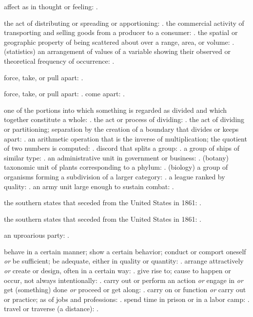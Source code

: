   affect as in thought or feeling: .

  the act of distributing or spreading or apportioning: . the commercial activity of transporting and selling goods from a producer to a consumer: . the spatial or geographic property of being scattered about over a range, area, or volume: . (statistics) an arrangement of values of a variable showing their observed or theoretical frequency of occurrence: .

  force, take, or pull apart: .

  force, take, or pull apart: . come apart: .

  one of the portions into which something is regarded as divided and which together constitute a whole: . the act or process of dividing: . the act of dividing or partitioning; separation by the creation of a boundary that divides or keeps apart: . an arithmetic operation that is the inverse of multiplication; the quotient of two numbers is computed: . discord that splits a group: . a group of ships of similar type: . an administrative unit in government or business: . (botany) taxonomic unit of plants corresponding to a phylum: . (biology) a group of organisms forming a subdivision of a larger category: . a league ranked by quality: . an army unit large enough to sustain combat: .

  the southern states that seceded from the United States in 1861: .

  the southern states that seceded from the United States in 1861: .

  an uproarious party: .

  behave in a certain manner; show a certain behavior; conduct or comport oneself \textit{or} be sufficient; be adequate, either in quality or quantity: . arrange attractively \textit{or} create or design, often in a certain way: . give rise to; cause to happen or occur, not always intentionally: . carry out or perform an action \textit{or} engage in \textit{or} get (something) done \textit{or} proceed or get along: . carry on or function \textit{or} carry out or practice; as of jobs and professions: . spend time in prison or in a labor camp: . travel or traverse (a distance): .

